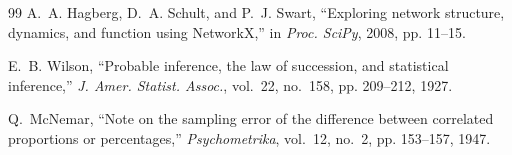 \documentclass[letterpaper, 10 pt, conference]{ieeeconf}
\begin{document}
\begin{thebibliography}{99}
A.~A. Hagberg, D.~A. Schult, and P.~J. Swart, ``Exploring network structure, dynamics,
and function using NetworkX,'' in \emph{Proc. SciPy}, 2008, pp. 11--15.

E.~B. Wilson, ``Probable inference, the law of succession, and statistical
inference,'' \emph{J. Amer. Statist. Assoc.}, vol.~22, no.~158, pp. 209--212, 1927.

Q.~McNemar, ``Note on the sampling error of the difference between correlated
proportions or percentages,'' \emph{Psychometrika}, vol.~12, no.~2, pp. 153--157, 1947.

\end{thebibliography}
\end{document}
